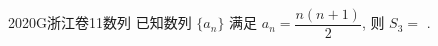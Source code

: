 
\begin{problem}{2020}{G}{浙江卷}{11}{数列}
已知数列 $ \{a_n\} $ 满足 $ a_n=\dfrac{n(n+1)}{2} $, 则 $ S_3= $ \underline{\hspace{4em}}.
\end{problem}

\begin{answer}

\end{answer}

\begin{solutions}

\end{solutions}